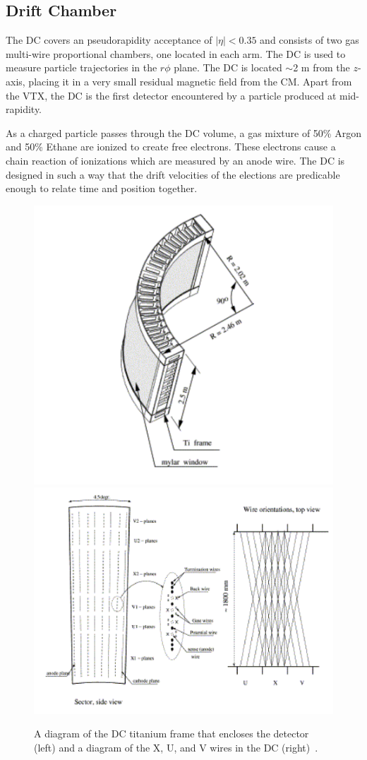 \subsection{Drift Chamber}
The DC covers an pseudorapidity acceptance of $|\eta| < 0.35$ and consists of two gas multi-wire proportional chambers, one located in each arm. The DC is used to measure particle trajectories in the $r\phi$ plane.
The DC is located $\sim$2 m from the $z$-axis, placing it in a very small residual magnetic field from the CM. Apart from the VTX, the DC is the first detector encountered by a particle produced at mid-rapidity. 

As a charged particle passes through the DC volume, a gas mixture of 50\% Argon and 50\% Ethane are ionized to create free electrons. These electrons cause a chain reaction of ionizations which are measured by an anode wire. The DC is designed in such a way that the drift velocities of the elections are predicable enough to relate time and position together. 

\begin{figure}[!ht]
\centering
\includegraphics[width=0.45\linewidth]{figs/dc_diagram.png}
\includegraphics[width=0.45\linewidth]{figs/dc_wire_diagram.png}
\caption{A diagram of the DC titanium frame that encloses the detector (left) and a diagram of the X, U, and V wires in the DC (right)~\cite{Adcox2003469}.}
\label{fig:dc_diagram}
\end{figure}

